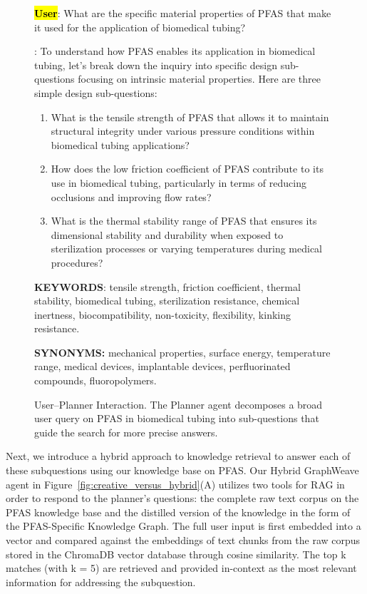 \begin{figure}[htbp]
  \centering
  \begin{mdframed}[
    frametitle={User–Planner Interaction},
    frametitlefont=\bfseries\sffamily\small,
    backgroundcolor=white,
    linecolor=black,
    linewidth=0.5pt,
    innerleftmargin=6pt,
    innerrightmargin=6pt,
    innertopmargin=6pt,
    innerbottommargin=6pt
  ]
    \ttfamily\scriptsize  %
    \textbf{\hl{User}}: What are the specific material properties of PFAS that make it used for the application of biomedical tubing?
    
    \medskip
    
    \textbf{}: To understand how PFAS enables its application in biomedical tubing, let's break down the inquiry into specific design sub-questions focusing on intrinsic material properties. Here are three simple design sub-questions:
    
    \begin{enumerate}
      \item What is the tensile strength of PFAS that allows it to maintain structural integrity under various pressure conditions within biomedical tubing applications?
      \item How does the low friction coefficient of PFAS contribute to its use in biomedical tubing, particularly in terms of reducing occlusions and improving flow rates?
      \item What is the thermal stability range of PFAS that ensures its dimensional stability and durability when exposed to sterilization processes or varying temperatures during medical procedures?
    \end{enumerate}
    
    \textbf{KEYWORDS}: tensile strength, friction coefficient, thermal stability, biomedical tubing, sterilization resistance, chemical inertness, biocompatibility, non-toxicity, flexibility, kinking resistance.
    
    \textbf{SYNONYMS:}  mechanical properties, surface energy, temperature range, medical devices, implantable devices, perfluorinated compounds, fluoropolymers.
  \end{mdframed}
  \caption{User–Planner Interaction. The Planner agent decomposes a broad user query on PFAS in biomedical tubing into sub-questions that guide the search for more precise answers.}
  \label{fig:planner-example}
\end{figure}

Next, we introduce a hybrid approach to knowledge retrieval to answer each of these subquestions using our knowledge base on PFAS. Our Hybrid GraphWeave agent in Figure~\ref{fig:creative_versus_hybrid}(A) utilizes two tools for RAG in order to respond to the planner's questions: the complete raw text corpus on the PFAS knowledge base and the distilled version of the knowledge in the form of the PFAS-Specific Knowledge Graph. The full user input is first embedded into a vector and compared against the embeddings of text chunks from the raw corpus stored in the ChromaDB vector database through cosine similarity. The top k matches (with k = 5) are retrieved and provided in-context as the most relevant information for addressing the subquestion. 

